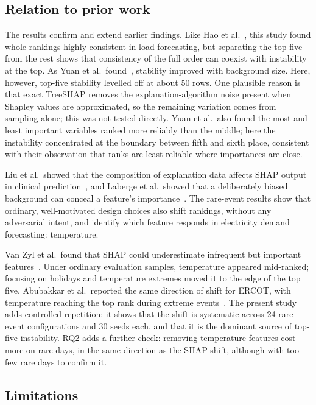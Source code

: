 \documentclass[11pt,a4paper]{article}
\begin{document}
\subsection{Relation to prior work}

The results confirm and extend earlier findings. Like Hao et al.~\cite{hao2026}, this study found whole rankings highly consistent in load forecasting, but separating the top five from the rest shows that consistency of the full order can coexist with instability at the top. As Yuan et al.\ found~\cite{yuan2023}, stability improved with background size. Here, however, top-five stability levelled off at about 50 rows. One plausible reason is that exact TreeSHAP removes the explanation-algorithm noise present when Shapley values are approximated, so the remaining variation comes from sampling alone; this was not tested directly. Yuan et al.\ also found the most and least important variables ranked more reliably than the middle; here the instability concentrated at the boundary between fifth and sixth place, consistent with their observation that ranks are least reliable where importances are close.

Liu et al.\ showed that the composition of explanation data affects SHAP output in clinical prediction~\cite{liu2022}, and Laberge et al.\ showed that a deliberately biased background can conceal a feature's importance~\cite{laberge2023}. The rare-event results show that ordinary, well-motivated design choices also shift rankings, without any adversarial intent, and identify which feature responds in electricity demand forecasting: temperature.

Van Zyl et al.\ found that SHAP could underestimate infrequent but important features~\cite{vanzyl2024}. Under ordinary evaluation samples, temperature appeared mid-ranked; focusing on holidays and temperature extremes moved it to the edge of the top five. Abubakkar et al.\ reported the same direction of shift for ERCOT, with temperature reaching the top rank during extreme events~\cite{abubakkar2026}. The present study adds controlled repetition: it shows that the shift is systematic across 24 rare-event configurations and 30 seeds each, and that it is the dominant source of top-five instability. RQ2 adds a further check: removing temperature features cost more on rare days, in the same direction as the SHAP shift, although with too few rare days to confirm it.

\subsection{Limitations}\label{sec:limitations}
\end{document}

